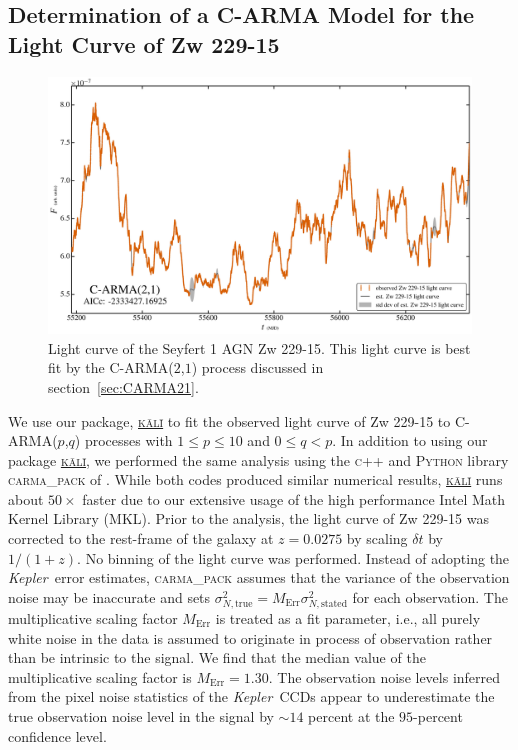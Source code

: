 \documentclass[a4paper,fleqn,usenatbib]{mnras}
\newcommand{\Kepler}{\textit{Kepler~}}
\begin{document}
\subsection[C-ARMA Model for Zw 229-15]{Determination of a C-ARMA Model for the Light Curve of Zw 229-15}\label{sec:Zw229-15CARMA}

\begin{figure}
    \includegraphics[width=\textwidth]{Figure2.jpg}
    \caption{Light curve of the Seyfert 1 AGN Zw 229-15. This light curve is best fit by the C-ARMA($2$,$1$) process discussed in section~\ref{sec:CARMA21}.}
    \label{fig:Zw229-15_LC}
\end{figure}

We use our package, \href{https://github.com/AstroVPK/kali}{\textsc{k\={a}l\={i}}} to fit the observed light curve of Zw 229-15 to C-ARMA($p$,$q$) processes with $1 \leq p \leq 10$ and $0 \leq q < p$. In addition to using our package \href{https://github.com/AstroVPK/kali}{\textsc{k\={a}l\={i}}}, we performed the same analysis using the \textsc{c++} and \textsc{Python} library \textsc{carma\_pack} of \citet{Kelly14}. While both codes produced similar numerical results, \href{https://github.com/AstroVPK/kali}{\textsc{k\={a}l\={i}}} runs about $50 \times$ faster due to our extensive usage of the high performance Intel Math Kernel Library (MKL). Prior to the analysis, the light curve of Zw 229-15 was corrected to the rest-frame of the galaxy at $z = 0.0275$ by scaling $\delta t$ by $1/(1+z)$. No binning of the light curve was performed. Instead of adopting the \Kepler error estimates, \textsc{carma\_pack} assumes that the variance of the observation noise may be inaccurate and sets $\sigma^{2}_{N,\mathrm{true}} = M_{\mathrm{Err}} \sigma^{2}_{N,\mathrm{stated}}$ for each observation. The multiplicative scaling factor $M_{\mathrm{Err}}$ is treated as a fit parameter, i.e., all purely white noise in the data is assumed to originate in process of observation rather than be intrinsic to the signal. We find that the median value of the multiplicative scaling factor is $M_{\mathrm{Err}} = 1.30$. The observation noise levels inferred from the pixel noise statistics of the \Kepler CCDs appear to underestimate the true observation noise level in the signal by $\sim 14$ percent at the $95$-percent confidence level.
\end{document}
